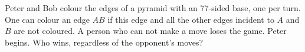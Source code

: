 \problem
Peter and Bob colour the edges of a pyramid with an 77-sided base, one per
turn.
One can colour an edge $AB$ if this edge and all the other edges incident to
$A$ and $B$ are not coloured.
A person who can not make a move loses the game.
Peter begins.
Who wins, regardless of the opponent's moves?

\solution

\endproblem
